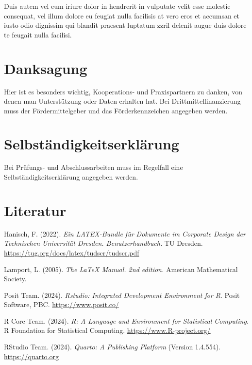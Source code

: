 \documentclass[
  11pt,
  a4paper,
]{tudscrreprt}
\newlength{\cslhangindent}
\newenvironment{CSLReferences}[2] %
 {\begin{list}{}{%
  \setlength{\itemindent}{0pt}
  \setlength{\leftmargin}{0pt}
  \setlength{\parsep}{0pt}
  \ifodd #1
   \setlength{\leftmargin}{\cslhangindent}
   \setlength{\itemindent}{-1\cslhangindent}
  \fi
  \setlength{\itemsep}{#2\baselineskip}}}
 {\end{list}}
\begin{document}
Duis autem vel eum iriure dolor in hendrerit in vulputate velit esse
molestie consequat, vel illum dolore eu feugiat nulla facilisis at vero
eros et accumsan et iusto odio dignissim qui blandit praesent luptatum
zzril delenit augue duis dolore te feugait nulla facilisi.

\chapter*{Danksagung}\label{danksagung}

Hier ist es besonders wichtig, Kooperations- und Praxispartnern zu
danken, von denen man Unterstützung oder Daten erhalten hat. Bei
Drittmittelfinanzierung muss der Fördermittelgeber und das
Förderkennzeichen angegeben werden.

\chapter*{Selbständigkeitserklärung}\label{selbstuxe4ndigkeitserkluxe4rung}

Bei Prüfungs- und Abschlussarbeiten muss im Regelfall eine
Selbständigkeitserklärung angegeben werden.

\chapter*{Literatur}\label{literatur}

\label{refs}
\begin{CSLReferences}{1}{0}
Hanisch, F. (2022). \emph{Ein LATEX-Bundle für Dokumente im Corporate
Design der Technischen Universität Dresden. Benutzerhandbuch.} TU
Dresden. \url{https://tug.org/docs/latex/tudscr/tudscr.pdf}

Lamport, L. (2005). \emph{The LaTeX Manual. 2nd edition.} {American
Mathematical Society}.

Posit Team. (2024). \emph{Rstudio: Integrated Development Environment
for R}. Posit Software, PBC. \url{https://www.posit.co/}

R Core Team. (2024). \emph{R: A Language and Environment for Statistical
Computing}. R Foundation for Statistical Computing.
\url{https://www.R-project.org/}

RStudio Team. (2024). \emph{Quarto: A Publishing Platform} (Version
1.4.554). \url{https://quarto.org}

\end{CSLReferences}
\end{document}
